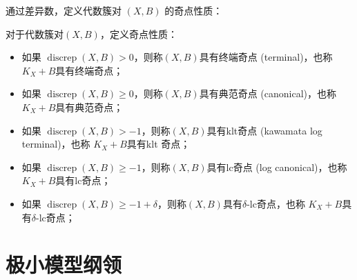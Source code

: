 通过差异数，定义代数簇对 $(X,B)$ 的奇点性质：
\begin{definition}
  对于代数簇对$(X,B)$，定义奇点性质：
  \begin{itemize}
    \item 如果 $\operatorname{discrep}(X,B)>0$，则称$(X,B) $具有终端奇点 (terminal)，也称 $K_{X}+B$具有终端奇点； 
    \item 如果 $\operatorname{discrep}(X,B)\geqslant 0$，则称$(X,B) $具有典范奇点 (canonical)，也称 $K_{X}+B$具有典范奇点； 
    \item 如果 $\operatorname{discrep}(X,B)>-1$，则称$(X,B) $具有klt奇点 (kawamata log terminal)，也称 $K_{X}+B$具有klt 奇点； 
    \item 如果 $\operatorname{discrep}(X,B)\geqslant -1$，则称$(X,B) $具有lc奇点 (log canonical)，也称 $K_{X}+B$具有lc奇点； 
    \item 如果 $\operatorname{discrep}(X,B)\geqslant -1+\delta$，则称$(X,B) $具有$\delta$-lc奇点，也称 $K_{X}+B$具有$\delta$-lc奇点； 
  \end{itemize}
\end{definition}

\section{极小模型纲领}

